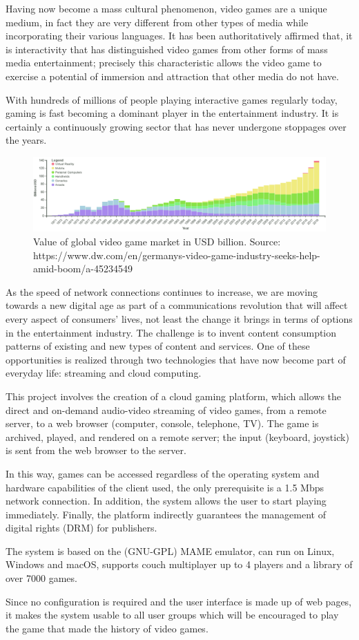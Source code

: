 \documentclass[english]{report}
\begin{document}
\begin{multicols}{2}
	Having now become a mass cultural phenomenon, video games are a unique medium, in fact they are very different from other types of media while incorporating their various languages. It has been authoritatively affirmed that, it is interactivity that has distinguished video games from other forms of mass media entertainment; precisely this characteristic allows the video game to exercise a potential of immersion and attraction that other media do not have.

	With hundreds of millions of people playing interactive games regularly today, gaming is fast becoming a dominant player in the entertainment industry.	It is certainly a continuously growing sector that has never undergone stoppages over the years.
	\begin{figure}[H]
		\includegraphics[width=\linewidth]{immagini/valore_commerciale_giochi_globale.png}
		\caption{Value of global video game market in USD billion. Source: https://www.dw.com/en/germanys-video-game-industry-seeks-help-amid-boom/a-45234549}
		\label{fig:valore_commerciale_giochi_globale}
	\end{figure}
	As the speed of network connections continues to increase, we are moving towards a new digital age as part of a communications revolution that will affect every aspect of consumers' lives, not least the change it brings in terms of options in the entertainment industry. The challenge is to invent content consumption patterns of existing and new types of content and services. One of these opportunities is realized through two technologies that have now become part of everyday life: streaming and cloud computing.

	This project involves the creation of a cloud gaming platform, which allows the direct and on-demand audio-video streaming of video games, from a remote server, to a web browser (computer, console, telephone, TV). The game is archived, played, and rendered on a remote server; the input (keyboard, joystick) is sent from the web browser to the server.

	In this way, games can be accessed regardless of the operating system and hardware capabilities of the client used, the only prerequisite is a 1.5 Mbps network connection. In addition, the system allows the user to start playing immediately. Finally, the platform indirectly guarantees the management of digital rights (DRM) for publishers.

	The system is based on the (GNU-GPL) MAME emulator, can run on Linux, Windows and macOS, supports couch multiplayer up to 4 players and a library of over 7000 games.

	Since no configuration is required and the user interface is made up of web pages, it makes the system usable to all user groups which will be encouraged to play the game that made the history of video games.
\end{multicols}
\end{document}
